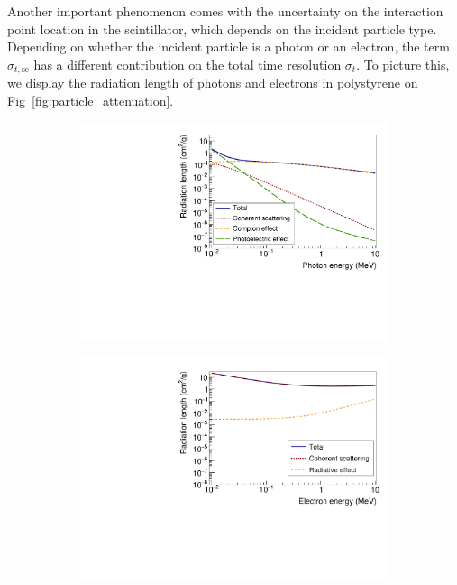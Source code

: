 Another important phenomenon comes with the uncertainty on the interaction point location in the scintillator, which depends on the incident particle type.
Depending on whether the incident particle is a photon or an electron, the term $\sigma_{t,\text{sc}}$ has a different contribution on the total time resolution $\sigma_{t}$.
To picture this, we display the radiation length of photons and electrons in polystyrene on Fig~\ref{fig:particle_attenuation}.
\begin{figure}[h]
\centering
\begin{subfigure}[t]{0.48\textwidth}
  \centering
  \includegraphics[width=1\textwidth]{commissioning/fig_commissioning/photon_energy_loss.pdf}
  \captionsetup{justification=justified}
  \caption{
    \label{subfig:photon}}
\end{subfigure}
\hfill
\begin{subfigure}[t]{0.48\textwidth}
  \centering
  \includegraphics[width=1\textwidth]{commissioning/fig_commissioning/electron_energy_loss.pdf}

\end{subfigure}
\end{figure}
